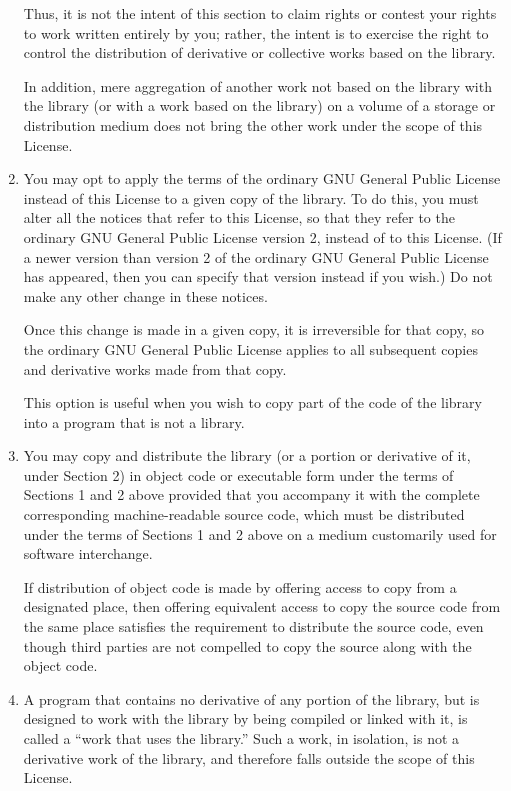 \documentclass[11pt, letterpaper]{book}
\begin{document}
\begin{enumerate}
Thus, it is not the intent of this section to claim rights or contest your
rights to work written entirely by you; rather, the intent is to exercise
the right to control the distribution of derivative or collective works
based on the library.

In addition, mere aggregation of another work not based on the library
with the library (or with a work based on the library) on a volume of a
storage or distribution medium does not bring the other work under the
scope of this License.

\item

You may opt to apply the terms of the ordinary GNU General Public License
instead of this License to a given copy of the library. To do this, you
must alter all the notices that refer to this License, so that they refer
to the ordinary GNU General Public License version 2, instead of to this
License. (If a newer version than version 2 of the ordinary GNU General
Public License has appeared, then you can specify that version instead if
you wish.)  Do not make any other change in these notices.

Once this change is made in a given copy, it is irreversible for that
copy, so the ordinary GNU General Public License applies to all subsequent
copies and derivative works made from that copy.

This option is useful when you wish to copy part of the code of the
library into a program that is not a library.

\item

You may copy and distribute the library (or a portion or derivative of it,
under Section 2) in object code or executable form under the terms of
Sections 1 and 2 above provided that you accompany it with the complete
corresponding machine-readable source code, which must be distributed
under the terms of Sections 1 and 2 above on a medium customarily used for
software interchange.

If distribution of object code is made by offering access to copy from a
designated place, then offering equivalent access to copy the source code
from the same place satisfies the requirement to distribute the source
code, even though third parties are not compelled to copy the source along
with the object code.

\item

A program that contains no derivative of any portion of the library, but
is designed to work with the library by being compiled or linked with it,
is called a ``work that uses the library.''  Such a work, in isolation, is
not a derivative work of the library, and therefore falls outside the
scope of this License.


\end{enumerate}
\end{document}
